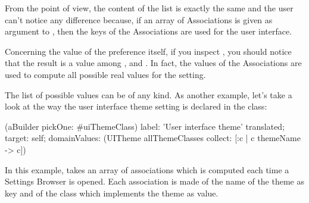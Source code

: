 \documentclass[a4paper,10pt,twoside]{book}
\begin{document}
From the \setbrowser point of view, the content of the list is exactly the same and the user can't notice any difference because, if an array of Associations is given as argument to , then the keys of the Associations are used for the user interface. 

Concerning the value of the preference itself, if you inspect , you should notice that the result is a value among ,   and . In fact, the values of the Associations are used to compute all possible real values for the setting.

The list of possible values can be of any kind. As another example, let's take a look at the way the user interface theme setting is declared in the  class:
\begin{code}{}
(aBuilder pickOne: #uiThemeClass)
	label: 'User interface theme' translated;
	target: self;
	domainValues: (UITheme allThemeClasses collect: [:c | c themeName -> c])
\end{code}
In this example,  takes an array of associations which is computed each time a Settings Browser is opened. Each association is made of the name of the theme as key and of the class which implements the theme as value.
\end{document}
